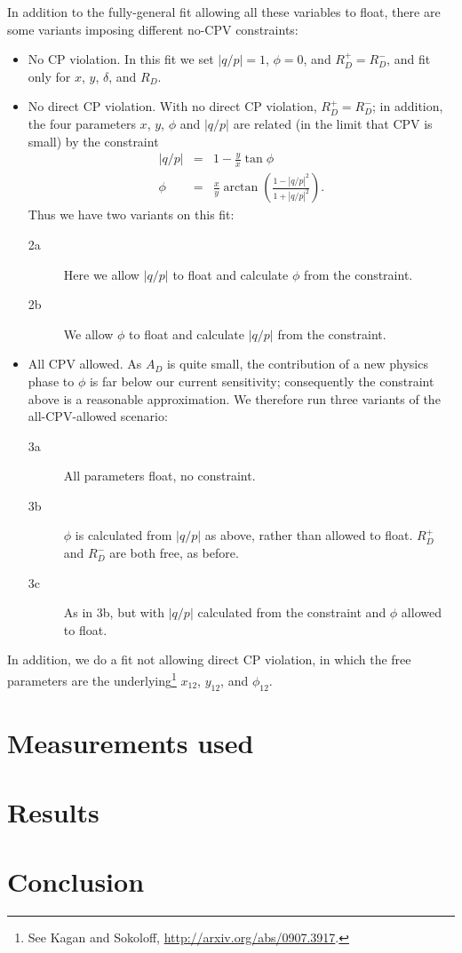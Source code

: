 \documentclass[12pt,pdflatex]{article}
\begin{document}
In addition to the fully-general fit allowing all these variables to float, 
there are some variants imposing different no-CPV constraints:
\begin{itemize}
\item No CP violation. In this fit we set $|q/p|=1$, $\phi=0$, and $R_D^+=R_D^-$, 
and fit only for $x$, $y$, $\delta$, and $R_D$. 
\item No direct CP violation. With no direct CP violation, $R_D^+=R_D^-$;
in addition, the four parameters $x$, $y$, $\phi$ and $|q/p|$ are related 
(in the limit that CPV is small) by the constraint
\begin{eqnarray}
|q/p| &=& 1 - \frac{y}{x}\tan\phi \\
\phi &=& \frac{x}{y}\arctan\left(\frac{1-|q/p|^2}{1+|q/p|^2}\right).
\end{eqnarray}
Thus we have two variants on this fit:
\begin{description}
\item[2a] Here we allow $|q/p|$ to float and calculate $\phi$
from the constraint. 
\item[2b] We allow $\phi$ to float and calculate $|q/p|$ from the constraint. 
\end{description}
\item All CPV allowed. As $A_D$ is quite
small, the contribution of a new physics phase to $\phi$ is far below
our current sensitivity; consequently the constraint above is a reasonable
approximation. We therefore run three variants of the all-CPV-allowed 
scenario:
\begin{description}
\item[3a] All parameters float, no constraint.
\item[3b] $\phi$ is calculated from $|q/p|$ as above, rather than allowed to float.
$R_D^+$ and $R_D^-$ are both free, as before.
\item[3c] As in 3b, but with $|q/p|$ calculated from the constraint and $\phi$ allowed
to float.
\end{description}
\end{itemize}

In addition, we do a fit not allowing direct CP violation, in which the
free parameters are the underlying\footnote{See Kagan and Sokoloff, \url{http://arxiv.org/abs/0907.3917}.}
$x_{12}$, $y_{12}$, and $\phi_{12}$. 

\section{Measurements used}



\section{Results}



\section{Conclusion}



\label{lastpage}
\end{document}
